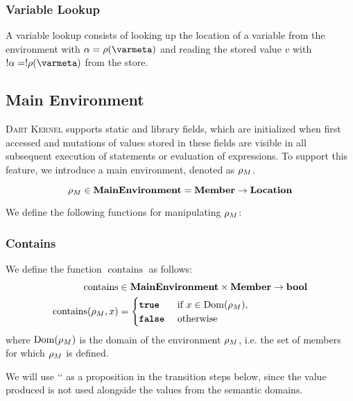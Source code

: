 \documentclass[a4paper,oneside,fleqn]{article}
\newcommand{\kernel}{\textsc{Dart Kernel}}
\DeclareMathOperator{\dom}{Dom} %
\DeclareMathOperator{\contains}{contains}
\newcommand{\synt}[1]{\ensuremath{\text{\textbf{\texttt{#1}}}}}
\newcommand{\true}{\synt{true}}
\newcommand{\false}{\synt{false}}
\newcommand{\dmember}{\mathbf{Member}}
\newcommand{\dsembool}{\mathbf{bool}}
\begin{document}
\subsubsection{Variable Lookup}
\label{subsubsec:variable-lookup}

A variable lookup consists of looking up the location of a variable from the environment with $\loc = \env(\varmeta)$ and reading the stored value $v$ with $\deref{\loc} = \deref{\env(\varmeta)}$ from the store.


\subsection{Main Environment}
\label{subsec:main-env}

\kernel{} supports static and library fields, which are initialized when first accessed and mutations of values stored in these fields are visible in all subsequent execution of statements or evaluation of expressions.
To support this feature, we introduce a main environment, denoted as $\rho_{M}$.

\newcommand{\dmainenv}{\textbf{MainEnvironment}}

\[\mainenv \in \dmainenv = \dmember \rightarrow \dlocation \]

We define the following functions for manipulating $\rho_{M}$:

\subsubsection{Contains}
We define the function $\contains$ as follows:
\begin{align*}
    \contains &\in \dmainenv \times \dmember \rightarrow \dsembool\\
    \contains(\mainenv, x) &=\begin{cases}
        \true &\text{ if }x \in \dom(\mainenv),\\
        \false &\text{ otherwise}
    \end{cases}
\end{align*}
where $\dom(\mainenv)$ is the domain of the environment $\rho_{M}$, i.e. the set of members for which $\rho_{M}$ is defined.

We will use `\contains` as a proposition in the transition steps below, since the value produced is not used alongside the values from the semantic domains.
\end{document}

